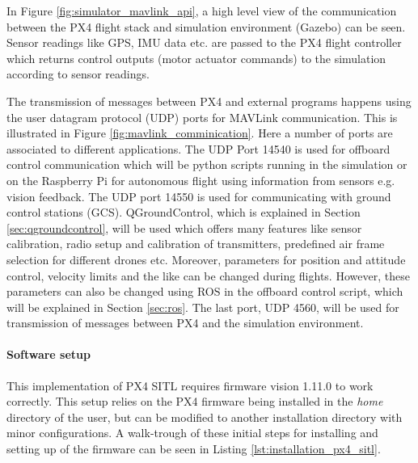 \documentclass[../Head/report.tex]{subfiles}
\begin{document}
In Figure \ref{fig:simulator_mavlink_api}, a high level view of the communication between the PX4 flight stack and simulation environment (Gazebo) can be seen. Sensor readings like GPS, IMU data etc. are passed to the PX4 flight controller which returns control outputs (motor actuator commands) to the simulation according to sensor readings. 

The transmission of messages between PX4 and external programs happens using  the user datagram protocol (UDP) ports for MAVLink communication. This is illustrated in Figure \ref{fig:mavlink_comminication}. Here a number of ports are associated to different applications. The UDP Port 14540 is used for offboard control communication which will be python scripts running in the simulation or on the Raspberry Pi for autonomous flight using information from sensors e.g. vision feedback. The UDP port 14550 is used for communicating with ground control stations (GCS). QGroundControl, which is explained in Section \ref{sec:qgroundcontrol},  will be used which offers many features like sensor calibration, radio setup and calibration of transmitters, predefined air frame selection for different drones etc. Moreover, parameters for position and attitude control, velocity limits and the like can be changed during flights. However, these parameters can also be changed using ROS in the offboard control script, which will be explained in Section \ref{sec:ros}. The last port, UDP 4560, will be used for transmission of messages between PX4 and the simulation environment.

\paragraph{Software setup}

This implementation of PX4 SITL requires firmware vision 1.11.0 to work correctly. This setup relies on the PX4 firmware being installed in the \textit{home} directory of the user, but can be modified to another installation directory with minor configurations. A walk-trough of these initial steps for installing and setting up of the firmware can be seen in Listing \ref{lst:installation_px4_sitl}. 
\end{document}
